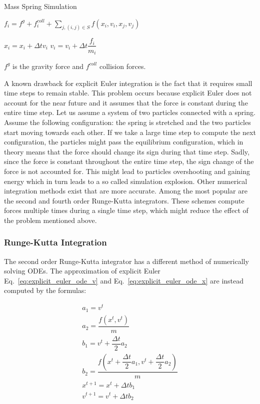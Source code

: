 \documentclass[en]{minipw} %
\begin{document}
\begin{algorithm}
\caption{Mass Spring Simulation}\label{euclid}
\begin{algorithmic}[1]
\State $f_i = f^{g} + f_{i}^{coll} + \sum_{j, (i,j) \in S} f(x_i, v_i, x_j, v_j)$
\EndFor

\State $x_{i} = x_{i} + \Delta t v_i $
\State $v_{i} = v_{i} + \Delta t \dfrac{f_i}{m_i} $
\EndFor

\EndWhile

\EndProcedure
\end{algorithmic}
\end{algorithm}

$f^{g}$ is the gravity force and $f^{coll}$ collision forces.

A known drawback for explicit Euler integration is the fact that it requires small time steps to remain stable. This problem occurs because explicit Euler does not account for the near future and it assumes that the force is constant during the entire time step. Let us assume a system of two particles connected with a spring. Assume the following configuration: the spring is stretched and the two particles start moving towards each other. If we take a large time step to compute the next configuration, the particles might pass the equilibrium configuration, which in theory means that the force should change its sign during that time step. Sadly, since the force is constant throughout the entire time step, the sign change of the force is not accounted for. This might lead to particles overshooting and gaining energy which in turn leads to a so called simulation explosion.
Other numerical integration methods exist that are more accurate. Among the most popular are the second and fourth order Runge-Kutta integrators. These schemes compute forces multiple times during a single time step, which might reduce the effect of the problem mentioned above.

\subsubsection{Runge-Kutta Integration}
The second order Runge-Kutta integrator has a different method of numerically solving ODEs. The approximation of explicit Euler Eq.~\ref{eq:explicit_euler_ode_v} and Eq.~\ref{eq:explicit_euler_ode_x} are instead computed by the formulas:


\begin{equation}
\begin{aligned}
a_1 = v^t
\\
a_2 = \dfrac{f(x^t, v^t)}{m}
\\
b_1 = v^t + \dfrac{\Delta t}{2} a_2
\\
b_2 = \dfrac{f(x^t + \dfrac{\Delta t}{2} a_1, v^t + \dfrac{\Delta t}{2} a_2)}{m}
\\
x^{t+1} = x^{t} + \Delta t b_1
\\
v^{t+1} = v^{t} + \Delta t b_2
\end{aligned}
\end{equation}
\end{document}
